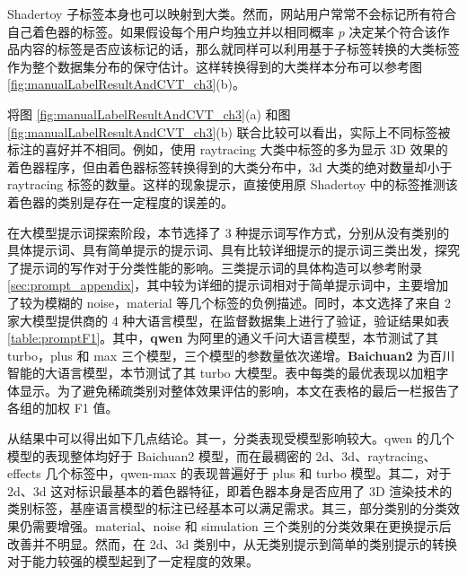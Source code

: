 {\added Shadertoy 子标签本身也可以映射到大类。然而，网站用户常常不会标记所有符合自己着色器的标签。如果假设每个用户均独立并以相同概率 $p$ 决定某个符合该作品内容的标签是否应该标记的话，那么就同样可以利用基于子标签转换的大类标签作为整个数据集分布的保守估计。这样转换得到的大类样本分布可以参考图 \ref{fig:manualLabelResultAndCVT_ch3}(b)。

将图 \ref{fig:manualLabelResultAndCVT_ch3}(a) 和图 \ref{fig:manualLabelResultAndCVT_ch3}(b) 联合比较可以看出，实际上不同标签被标注的喜好并不相同。例如，使用 raytracing 大类中标签的多为显示 3D 效果的着色器程序，但由着色器标签转换得到的大类分布中，3d 大类的绝对数量却小于 raytracing 标签的数量。这样的现象提示，直接使用原 Shadertoy 中的标签推测该着色器的类别是存在一定程度的误差的。

在大模型提示词探索阶段，本节选择了 3 种提示词写作方式，分别从没有类别的具体提示词、具有简单提示的提示词、具有比较详细提示的提示词三类出发，探究了提示词的写作对于分类性能的影响。三类提示词的具体构造可以参考附录 \ref{sec:prompt_appendix}，其中较为详细的提示词相对于简单提示词中，主要增加了较为模糊的 noise，material 等几个标签的负例描述。同时，本文选择了来自 2 家大模型提供商的 4 种大语言模型，在监督数据集上进行了验证，验证结果如表 \ref{table:promptF1}。其中，{\bf qwen} 为阿里的通义千问大语言模型，本节测试了其 turbo，plus 和 max 三个模型，三个模型的参数量依次递增。{\bf Baichuan2} 为百川智能的大语言模型，本节测试了其 turbo 大模型。表中每类的最优表现以加粗字体显示。为了避免稀疏类别对整体效果评估的影响，本文在表格的最后一栏报告了各组的加权 F1 值。

从结果中可以得出如下几点结论。其一，分类表现受模型影响较大。qwen 的几个模型的表现整体均好于 Baichuan2 模型，而在最稠密的 2d、3d、raytracing、effects 几个标签中，qwen-max 的表现普遍好于 plus 和 turbo 模型。其二，对于 2d、3d 这对标识最基本的着色器特征，即着色器本身是否应用了 3D 渲染技术的类别标签，基座语言模型的标注已经基本可以满足需求。其三，部分类别的分类效果仍需要增强。material、noise 和 simulation 三个类别的分类效果在更换提示后改善并不明显。然而，在 2d、3d 类别中，从无类别提示到简单的类别提示的转换对于能力较强的模型起到了一定程度的效果。

}


